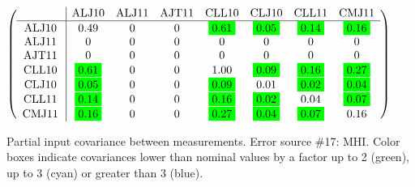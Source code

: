 \begin{table}[H]
\scriptsize
\begin{center}
\renewcommand{\arraystretch}{1.1}
\begin{math}\left(\begin{array}{c|ccccccc}
 & \mathrm{ALJ10} & 
\mathrm{ALJ11} & 
\mathrm{AJT11} & 
\mathrm{CLL10} & 
\mathrm{CLJ10} & 
\mathrm{CLL11} & 
\mathrm{CMJ11} \\
\hline
\mathrm{ALJ10} \hspace*{2pt} &       0.49 &  0 &  0 &  \colorbox{Green1}{$      0.61$} &  \colorbox{Green1}{$      0.05$} &  \colorbox{Green1}{$      0.14$} &  \colorbox{Green1}{$      0.16$} \\
\mathrm{ALJ11} \hspace*{2pt} &  0 &  0 &  0 &  0 &  0 &  0 &  0 \\
\mathrm{AJT11} \hspace*{2pt} &  0 &  0 &  0 &  0 &  0 &  0 &  0 \\
\mathrm{CLL10} \hspace*{2pt} &  \colorbox{Green1}{$      0.61$} &  0 &  0 &       1.00 &  \colorbox{Green1}{$      0.09$} &  \colorbox{Green1}{$      0.16$} &  \colorbox{Green1}{$      0.27$} \\
\mathrm{CLJ10} \hspace*{2pt} &  \colorbox{Green1}{$      0.05$} &  0 &  0 &  \colorbox{Green1}{$      0.09$} &       0.01 &  \colorbox{Green1}{$      0.02$} &  \colorbox{Green1}{$      0.04$} \\
\mathrm{CLL11} \hspace*{2pt} &  \colorbox{Green1}{$      0.14$} &  0 &  0 &  \colorbox{Green1}{$      0.16$} &  \colorbox{Green1}{$      0.02$} &       0.04 &  \colorbox{Green1}{$      0.07$} \\
\mathrm{CMJ11} \hspace*{2pt} &  \colorbox{Green1}{$      0.16$} &  0 &  0 &  \colorbox{Green1}{$      0.27$} &  \colorbox{Green1}{$      0.04$} &  \colorbox{Green1}{$      0.07$} &       0.16 \\
\end{array}\right)\end{math}
\caption{Partial input covariance between measurements. Error source \#17: MHI. Color boxes indicate covariances lower than nominal values by a factor up to 2 (green), up to 3 (cyan) or greater than 3 (blue).}
\renewcommand{\arraystretch}{1}
\end{center}
\end{table}
\clearpage
